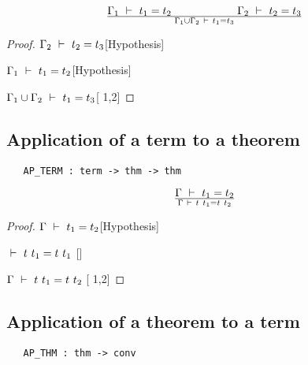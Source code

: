 \vspace{12pt plus2pt minus1pt}

$$\Gamma_1\ \vdash\  t_1=t_2\qquad\qquad\qquad \Gamma_2\ \vdash\  t_2=t_3 \over
\Gamma_1\cup\Gamma_2\ \vdash\  t_1=t_3$$

\vspace{12pt plus2pt minus1pt}

\begin{proof}
\item $\Gamma_2\ \vdash\  t_2=t_3$\hfill [Hypothesis]
\item $\Gamma_1\ \vdash\  t_1=t_2$\hfill [Hypothesis]
\item $\Gamma_1\cup\Gamma_2\ \vdash\  t_1=t_3$\hfill [ 1,2]
\end{proof}



\subsection{Application of a term to a theorem}

\begin{boxed}
\begin{verbatim}
   AP_TERM : term -> thm -> thm
\end{verbatim}\end{boxed}

\vspace{12pt plus2pt minus1pt}

$$\Gamma\turn t_1=t_2\over\Gamma\turn t\ t_1 = t\ t_2$$

\vspace{12pt plus2pt minus1pt}

\begin{proof}
\item $\Gamma\ \vdash\  t_1=t_2$\hfill [Hypothesis]
\item $\ \vdash\  t\ t_1 = t\ t_1$ \hfill []
\item $\Gamma\ \vdash\  t\ t_1 = t\ t_2$ \hfill [ 1,2]
\end{proof}



\subsection{Application of a theorem to a term}

\begin{boxed}
\begin{verbatim}
   AP_THM : thm -> conv
\end{verbatim}\end{boxed}

